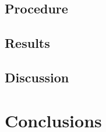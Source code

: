 \documentclass[12pt]{article}
\begin{document}
\subsection{Procedure}


\subsection{Results}

\subsection{Discussion}


\section{Conclusions}
\end{document}
